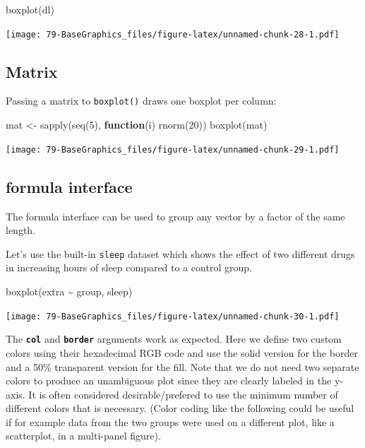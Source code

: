 \documentclass[
]{book}
\newenvironment{Shaded}{\begin{snugshade}}{\end{snugshade}}
\newcommand{\ControlFlowTok}[1]{\textcolor[rgb]{0.13,0.29,0.53}{\textbf{#1}}}
\newcommand{\DecValTok}[1]{\textcolor[rgb]{0.00,0.00,0.81}{#1}}
\newcommand{\FunctionTok}[1]{\textcolor[rgb]{0.00,0.00,0.00}{#1}}
\newcommand{\NormalTok}[1]{#1}
\newcommand{\OtherTok}[1]{\textcolor[rgb]{0.56,0.35,0.01}{#1}}
\newcommand{\SpecialCharTok}[1]{\textcolor[rgb]{0.00,0.00,0.00}{#1}}
\begin{document}
\begin{Shaded}
\begin{Highlighting}[]
\FunctionTok{boxplot}\NormalTok{(dl)}
\end{Highlighting}
\end{Shaded}

\texttt{[image: 79-BaseGraphics\_files/figure-latex/unnamed-chunk-28-1.pdf]}

\hypertarget{matrix-1}{%
\subsection{Matrix}\label{matrix-1}}

Passing a matrix to \texttt{boxplot()} draws one boxplot per column:

\begin{Shaded}
\begin{Highlighting}[]
\NormalTok{mat }\OtherTok{\textless{}{-}} \FunctionTok{sapply}\NormalTok{(}\FunctionTok{seq}\NormalTok{(}\DecValTok{5}\NormalTok{), }\ControlFlowTok{function}\NormalTok{(i) }\FunctionTok{rnorm}\NormalTok{(}\DecValTok{20}\NormalTok{))}
\FunctionTok{boxplot}\NormalTok{(mat)}
\end{Highlighting}
\end{Shaded}

\texttt{[image: 79-BaseGraphics\_files/figure-latex/unnamed-chunk-29-1.pdf]}

\hypertarget{formula-interface}{%
\subsection{formula interface}\label{formula-interface}}

The formula interface can be used to group any vector by a factor of the same length.

Let's use the built-in \texttt{sleep} dataset which shows the effect of two different drugs in increasing hours of sleep compared to a control group.

\begin{Shaded}
\begin{Highlighting}[]
\FunctionTok{boxplot}\NormalTok{(extra }\SpecialCharTok{\textasciitilde{}}\NormalTok{ group, sleep)}
\end{Highlighting}
\end{Shaded}

\texttt{[image: 79-BaseGraphics\_files/figure-latex/unnamed-chunk-30-1.pdf]}

The \textbf{\texttt{col}} and \textbf{\texttt{border}} arguments work as expected. Here we define two custom colors using their hexadecimal RGB code and use the solid version for the border and a 50\% transparent version for the fill. Note that we do not need two separate colors to produce an unambiguous plot since they are clearly labeled in the y-axis. It is often considered desirable/prefered to use the minimum number of different colors that is necessary. (Color coding like the following could be useful if for example data from the two groups were used on a different plot, like a scatterplot, in a multi-panel figure).
\end{document}
